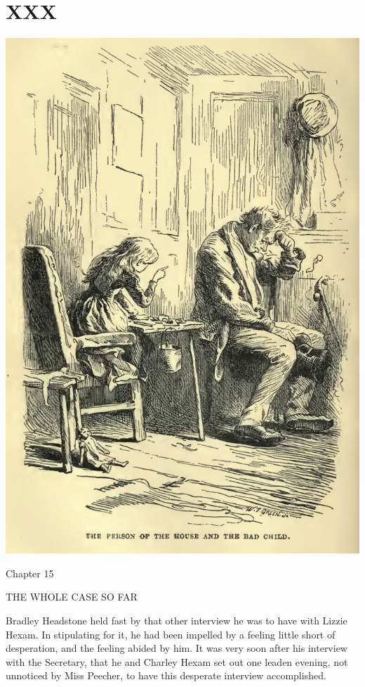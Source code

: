 
\chapter{XXX}

\includegraphics[scale=2.3]{02-02-01}

Chapter 15

THE WHOLE CASE SO FAR


Bradley Headstone held fast by that other interview he was to have with
Lizzie Hexam. In stipulating for it, he had been impelled by a feeling
little short of desperation, and the feeling abided by him. It was very
soon after his interview with the Secretary, that he and Charley Hexam
set out one leaden evening, not unnoticed by Miss Peecher, to have this
desperate interview accomplished.

